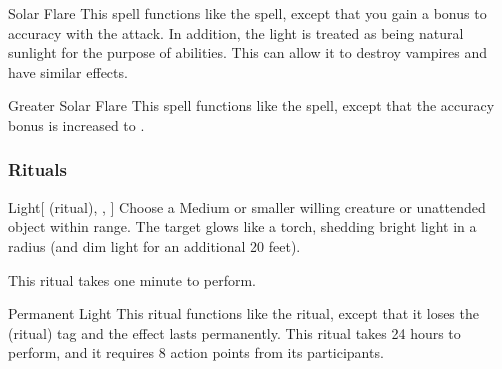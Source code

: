 \lowercase{\hypertarget{spell:Solar Flare}{}}\label{spell:Solar Flare}
\begin{ability}[\nth{4}]{\hypertarget{spell:Solar Flare}{Solar Flare}}
This spell functions like the  spell, except that you gain a  bonus to accuracy with the attack.
In addition, the light is treated as being natural sunlight for the purpose of abilities.
This can allow it to destroy vampires and have similar effects.
\end{ability}
\vspace{0.25em}



\lowercase{\hypertarget{spell:Greater Solar Flare}{}}\label{spell:Greater Solar Flare}
\begin{ability}[\nth{7}]{\hypertarget{spell:Greater Solar Flare}{Greater Solar Flare}}
This spell functions like the  spell, except that the accuracy bonus is increased to .
\end{ability}
\vspace{0.25em}



\subsubsection{Rituals}


\lowercase{\hypertarget{spell:Light}{}}\label{spell:Light}
\begin{ability}[\nth{1}]{\hypertarget{spell:Light}{Light}}[ (ritual), , ]
Choose a Medium or smaller willing creature or unattended object within \rngclose range.
The target glows like a torch, shedding bright light in a \areamed radius (and dim light for an additional 20 feet).

This ritual takes one minute to perform.
\end{ability}
\vspace{0.25em}



\lowercase{\hypertarget{spell:Permanent Light}{}}\label{spell:Permanent Light}
\begin{ability}[\nth{2}]{\hypertarget{spell:Permanent Light}{Permanent Light}}
This ritual functions like the  ritual, except that it loses the  (ritual) tag and the effect lasts permanently.
This ritual takes 24 hours to perform, and it requires 8 action points from its participants.
\end{ability}
\vspace{0.25em}


